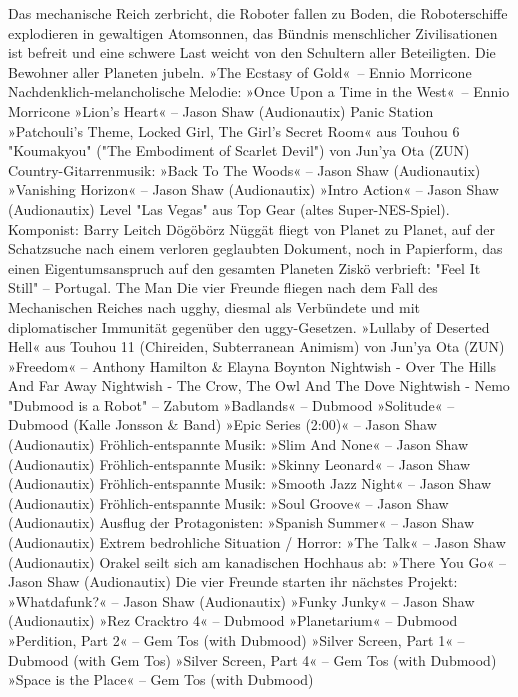     Das mechanische Reich zerbricht, die Roboter fallen zu Boden, die Roboterschiffe explodieren in gewaltigen Atomsonnen, das Bündnis menschlicher Zivilisationen ist befreit und eine schwere Last weicht von den Schultern aller Beteiligten. Die Bewohner aller Planeten jubeln. »The Ecstasy of Gold«~– Ennio Morricone
    Nachdenklich-melancholische Melodie: »Once Upon a Time in the West«~– Ennio Morricone
    »Lion's Heart« – Jason Shaw (Audionautix)
    Panic Station
    »Patchouli's Theme, Locked Girl, The Girl's Secret Room« aus Touhou 6 "Koumakyou" ("The Embodiment of Scarlet Devil") von Jun'ya Ota (ZUN)
    Country-Gitarrenmusik: »Back To The Woods« – Jason Shaw (Audionautix)
    »Vanishing Horizon« – Jason Shaw (Audionautix)
    »Intro Action« – Jason Shaw (Audionautix)
    Level "Las Vegas" aus Top Gear (altes Super-NES-Spiel). Komponist: Barry Leitch
    Dögöbörz Nüggät fliegt von Planet zu Planet, auf der Schatzsuche nach einem verloren geglaubten Dokument, noch in Papierform, das einen Eigentumsanspruch auf den gesamten Planeten Ziskö verbrieft: "Feel It Still" – Portugal. The Man
    Die vier Freunde fliegen nach dem Fall des Mechanischen Reiches nach ugghy, diesmal als Verbündete und mit diplomatischer Immunität gegenüber den uggy-Gesetzen. »Lullaby of Deserted Hell« aus Touhou 11 (Chireiden, Subterranean Animism) von Jun'ya Ota (ZUN)
    »Freedom« – Anthony Hamilton & Elayna Boynton
    Nightwish - Over The Hills And Far Away
    Nightwish - The Crow, The Owl And The Dove
    Nightwish - Nemo
    "Dubmood is a Robot" – Zabutom
    »Badlands« – Dubmood
    »Solitude« – Dubmood (Kalle Jonsson & Band)
    »Epic Series (2:00)« – Jason Shaw (Audionautix)
    Fröhlich-entspannte Musik: »Slim And None« – Jason Shaw (Audionautix)
    Fröhlich-entspannte Musik: »Skinny Leonard« – Jason Shaw (Audionautix)
    Fröhlich-entspannte Musik: »Smooth Jazz Night« – Jason Shaw (Audionautix)
    Fröhlich-entspannte Musik: »Soul Groove« – Jason Shaw (Audionautix)
    Ausflug der Protagonisten: »Spanish Summer« – Jason Shaw (Audionautix)
    Extrem bedrohliche Situation / Horror: »The Talk« – Jason Shaw (Audionautix)
    Orakel seilt sich am kanadischen Hochhaus ab: »There You Go« – Jason Shaw (Audionautix)
    Die vier Freunde starten ihr nächstes Projekt: »Whatdafunk?« – Jason Shaw (Audionautix)
    »Funky Junky« – Jason Shaw (Audionautix)
    »Rez Cracktro 4« – Dubmood
    »Planetarium« – Dubmood
    »Perdition, Part 2« – Gem Tos (with Dubmood)
    »Silver Screen, Part 1« – Dubmood (with Gem Tos)
    »Silver Screen, Part 4« – Gem Tos (with Dubmood)
    »Space is the Place« – Gem Tos (with Dubmood)
